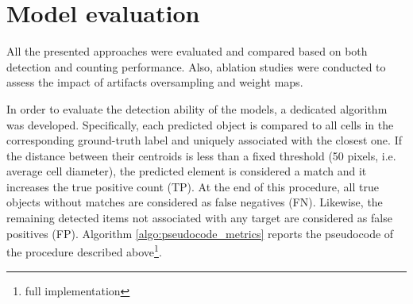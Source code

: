\section{Model evaluation} \label{sec:model_evaluation}

All the presented approaches were evaluated and compared based on both detection and counting performance. 
Also, ablation studies were conducted to assess the impact of artifacts oversampling and weight maps.

In order to evaluate the detection ability of the models, a dedicated algorithm was developed.
Specifically, each predicted object is compared to all cells in the corresponding ground-truth label and uniquely associated with the closest one.
If the distance between their centroids is less than a fixed threshold (50 pixels, i.e. average cell diameter), the predicted element is considered a match and it increases the true positive count (TP).
At the end of this procedure, all true objects without matches are considered as false negatives (FN). Likewise, the remaining detected items not associated with any target are considered as false positives (FP).
Algorithm \ref{algo:pseudocode_metrics} reports the pseudocode of the procedure described above\footnote{full implementation \githubmetrics}.
